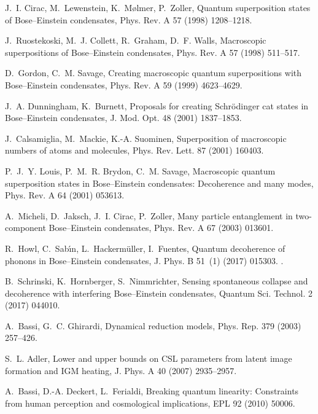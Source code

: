 \documentclass[3p,sort&compress,12pt]{elsarticle}
\begin{document}
\begin{thebibliography}{100}
J.~I. Cirac, M.~Lewenstein, K.~M{\o}lmer, P.~Zoller, Quantum superposition
  states of {B}ose--{E}instein condensates, Phys. Rev. A 57 (1998) 1208--1218.

J.~Ruostekoski, M.~J. Collett, R.~Graham, D.~F. Walls, Macroscopic
  superpositions of {B}ose--{E}instein condensates, Phys. Rev. A 57 (1998)
  511--517.

D.~Gordon, C.~M. Savage, Creating macroscopic quantum superpositions with
  {B}ose--{E}instein condensates, Phys. Rev. A 59 (1999) 4623--4629.

J.~A. Dunningham, K.~Burnett, Proposals for creating {S}chr{\"o}dinger cat
  states in {B}ose--{E}instein condensates, J. Mod. Opt. 48 (2001) 1837--1853.

J.~Calsamiglia, M.~Mackie, K.-A. Suominen, Superposition of macroscopic numbers
  of atoms and molecules, Phys. Rev. Lett. 87 (2001) 160403.

P.~J.~Y. Louis, P.~M.~R. Brydon, C.~M. Savage, Macroscopic quantum
  superposition states in {B}ose--{E}instein condensates: Decoherence and many
  modes, Phys. Rev. A 64 (2001) 053613.

A.~Micheli, D.~Jaksch, J.~I. Cirac, P.~Zoller, Many particle entanglement in
  two-component {B}ose--{E}instein condensates, Phys. Rev. A 67 (2003) 013601.

R.~Howl, C.~Sab{\'{\i}}n, L.~Hackerm{\"u}ller, I.~Fuentes, Quantum decoherence
  of phonons in {B}ose--{E}instein condensates, J. Phys. B 51~(1) (2017)
  015303.
\newblock \href {http://dx.doi.org/10.1088/1361-6455/aa9622}
  {}.

B.~Schrinski, K.~Hornberger, S.~Nimmrichter, Sensing spontaneous collapse and
  decoherence with interfering {B}ose--{E}instein condensates, Quantum Sci.
  Technol. 2 (2017) 044010.

A.~Bassi, G.~C. Ghirardi, Dynamical reduction models, Phys. Rep. 379 (2003)
  257--426.

S.~L. Adler, Lower and upper bounds on {CSL} parameters from latent image
  formation and {IGM} heating, J. Phys. A 40 (2007) 2935--2957.

A.~Bassi, D.-A. Deckert, L.~Ferialdi, Breaking quantum linearity: {C}onstraints
  from human perception and cosmological implications, EPL 92 (2010) 50006.


\end{thebibliography}
\end{document}
